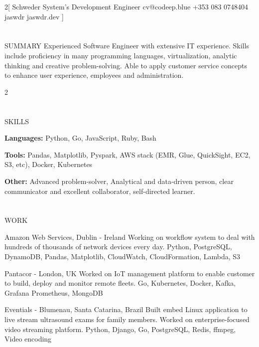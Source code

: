 \documentclass{my_cv}
\begin{document}
\begin{multicols}{2}[
        {Schweder}%
        {System's Development Engineer}%
        {cv@codeep.blue}%
        {+353 083 0748404}%
        {jaswdr}%
        {jaswdr.dev}%
]
\end{multicols}

\section{\faFileText}{SUMMARY}
Experienced Software Engineer with extensive IT experience. Skills include proficiency in many programming languages, virtualization, analytic thinking and creative problem-solving. Able to apply customer service concepts to enhance user experience, employees and administration.

\begin{multicols}{2}

\section{\faList}{SKILLS}

\textbf{Languages:} Python, Go, JavaScript, Ruby, Bash

\noindent\textbf{Tools:} Pandas, Matplotlib, Pyspark, AWS stack (EMR, Glue, QuickSight, EC2, S3, etc), Docker, Kubernetes

\noindent\textbf{Other:} Advanced problem-solver, Analytical and data-driven person, clear communicator and excellent collaborator, self-directed learner.

\section{\faPencil}{WORK}

%
    {Amazon Web Services, Dublin - Ireland}%
    {Working on workflow system to deal with hundreds of thousands of network devices every day.}
    {Python, PostgreSQL, DynamoDB, Pandas, Matplotlib, CloudWatch, CloudFormation, Lambda, S3}

%
    {Pantacor - London, UK}%
    {Worked on IoT management platform to enable customer to build, deploy and monitor remote fleets.}%
    {Go, Kubernetes, Docker, Kafka, Grafana Prometheus, MongoDB}

%
    {Eventials - Blumenau, Santa Catarina, Brazil}%
    {Built embed Linux application to live stream ultrasound exams for family members. Worked on enterprise-focused video streaming platform.}%
    {Python, Django, Go, PostgreSQL, Redis, ffmpeg, Video encoding}


\end{multicols}
\end{document}
